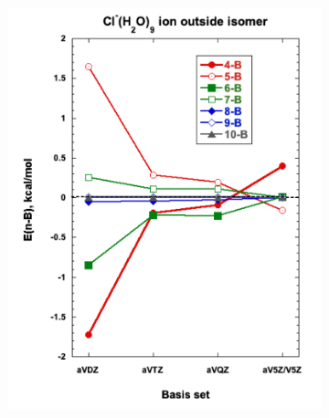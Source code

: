 \documentclass[11pt, proquest]{uwthesis}[2020/02/24]
\begin{document}
\begin{figure}
  \begin{subfigure}[t]{.5\textwidth}
    \centering
    \includegraphics[width=\linewidth]{Figures/Chapter_3/figure_7_tl.pdf}
  \end{subfigure}
  \hfill
  \begin{subfigure}[t]{.5\textwidth}
    \centering

\end{subfigure}
\end{figure}
\end{document}
